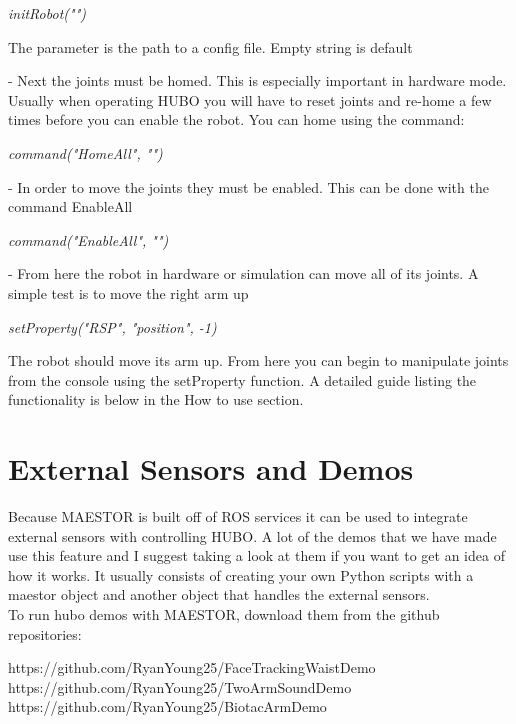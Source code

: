 \documentclass[12pt]{article}
\begin{document}
		\begin{center}
			\textit{initRobot("")}
		\end{center}          
		
		The parameter is the path to a config file. Empty string is default

	- Next the joints must be homed. This is especially important in hardware mode. Usually when operating HUBO you will have to reset joints and re-home a few times before you can enable the robot. You can home using the command:
		
		\begin{center}
			\textit{command("HomeAll", "")}
		\end{center}

    - In order to move the joints they must be enabled. This can be done with the command EnableAll
		\begin{center}
			\textit{command("EnableAll", "")}
		\end{center}
		

			
	- From here the robot in hardware or simulation can move all of its joints. A simple test is to move the right arm up 
		\begin{center}
			\textit{setProperty("RSP", "position", -1)}
		\end{center}
		 
		
\noindent 
The robot should move its arm up. From here you can begin to manipulate joints from the console using the setProperty function. A detailed guide listing the functionality is below in the How to use section.
	
\section{External Sensors and Demos}
	Because MAESTOR is built off of ROS services it can be used to integrate external sensors with controlling HUBO. A lot of the demos that we have made use this feature and I suggest taking a look at them if you want to get an idea of how it works. It usually consists of creating your own Python scripts with a maestor object and another object that handles the external sensors. \\

To run hubo demos with MAESTOR, download them from the github repositories: 

	\begin{flushleft}
		https://github.com/RyanYoung25/FaceTrackingWaistDemo
		https://github.com/RyanYoung25/TwoArmSoundDemo
		https://github.com/RyanYoung25/BiotacArmDemo
	\end{flushleft}
\end{document}
